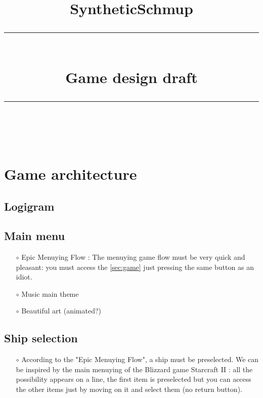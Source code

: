 \documentclass[12pt,a4paper]{article}
\title{ SyntheticSchmup \\
[0.5cm]
\rule{\linewidth}{2pt} \\[0.4cm]
\Huge Game design draft \\
\rule{\linewidth}{2pt}\\
[0.5cm]}
\begin{document}

\makeatletter \begin{center}{\LARGE \@title \par} \@date \end{center} \makeatother


\tableofcontents
\thispagestyle{empty} %
\newpage
\clearpage
\setcounter{page}{1}

\section{Game architecture}
    \subsection{Logigram}
    
    \subsection{Main menu}
        \begin{itemize}
            \item[$\circ$] Epic Menuying Flow : The menuying game flow must be very quick and pleasant: you must access the \ref{sec:game} just pressing the same button as an idiot.
            \item[$\circ$] Music main theme
            \item[$\circ$] Beautiful art (animated?)
        \end{itemize}

    \subsection{Ship selection}
        \begin{itemize}
            \item[$\circ$] According to the "Epic Menuying Flow", a ship must be preselected. We can be inspired by the main menuying of the Blizzard game Starcraft II : all the possibility appears on a line, the first item is preselected but you can access the other items just by moving on it and select them (no return button).
        \end{itemize}
        
\end{document}
